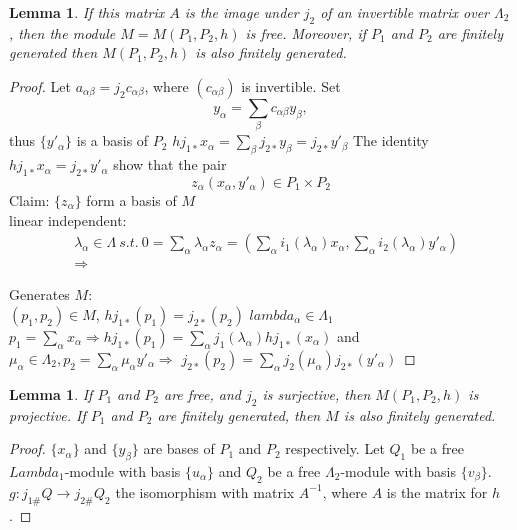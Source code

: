 \documentclass[11pt]{article}
\newtheorem{lemma}[thm]{Lemma}
\newcommand{\lrta}{\longrightarrow}
\newcommand{\Lrta}{\Longrightarrow}
\begin{document}
\begin{lemma}
If this matrix $A$ is the image under $j_2$ of an invertible matrix over $\Lambda_2$, then the module $M=M(P_1,P_2,h)$ is free. Moreover, if $P_1$ and $P_2$ are finitely generated then $M(P_1,P_2,h)$ is also finitely generated.
\end{lemma}
\begin{proof}
Let $a_{\alpha\beta}=j_2c_{\alpha\beta}$, where $(c_{\alpha\beta})$ is invertible. Set 
$$
y_\alpha=\sum_\beta c_{\alpha\beta}y_\beta,
$$
thus $\{y'_{\alpha}\}$ is a basis of $P_2$
$h j_{1*}x_\alpha=\sum_{\beta}j_{2*}y_\beta=j_{2*}y'_{\beta}$
The identity $h j_{1*}x_\alpha=j_{2*}y'_\alpha$ show that the pair
$$
z_\alpha(x_\alpha,y'_\alpha)\in P_1\times P_2
$$
Claim: $\{z_\alpha\}$ form a basis of $M$\\
linear independent:\\
$$
\begin{aligned}
&\lambda_\alpha\in \Lambda\ s.t.\ 0=\sum_\alpha \lambda_\alpha z_\alpha=(\sum_\alpha i_1(\lambda_\alpha)x_\alpha,\sum_\alpha i_2(\lambda_\alpha)y'_\alpha)\\
&\Lrta 
\end{aligned}
$$

Generates $M$:\\
$(p_1,p_2)\in M$, $h j_{1*}(p_1)=j_{2*}(p_2)$
$lambda_\alpha\in \Lambda_1$ $p_1=\sum_\alpha x_\alpha\Lrta h j_{1*}(p_1)=\sum_\alpha j_1(\lambda_\alpha)h j_{1*}(x_\alpha)$ and $\mu_\alpha\in \Lambda_2, p_2=\sum_\alpha\mu_\alpha y'_\alpha\Lrta$ $j_{2*}(p_2)=\sum_\alpha j_2(\mu_\alpha)j_{2*}(y'_\alpha)$

\end{proof}

\begin{lemma}
If $P_1$ and $P_2$ are free, and $j_2$ is surjective, then $M(P_1,P_2, h)$ is projective. If $P_1$ and $P_2$ are finitely generated, then $M$  is also finitely generated.
\end{lemma}
\begin{proof}
$\{x_\alpha\}$ and $\{y_\beta\}$ are bases of $P_1$ and $P_2$ respectively. Let $Q_1$ be a free $Lambda_1$-module with basis $\{u_\alpha\}$ and $Q_2$ be a free $\Lambda_2$-module with basis $\{v_\beta\}$. $g: j_{1\#}Q\lrta j_{2\#}Q_2$ the isomorphism with matrix $A^{-1}$, where $A$ is the matrix for $h$.
\end{proof}
\end{document}
